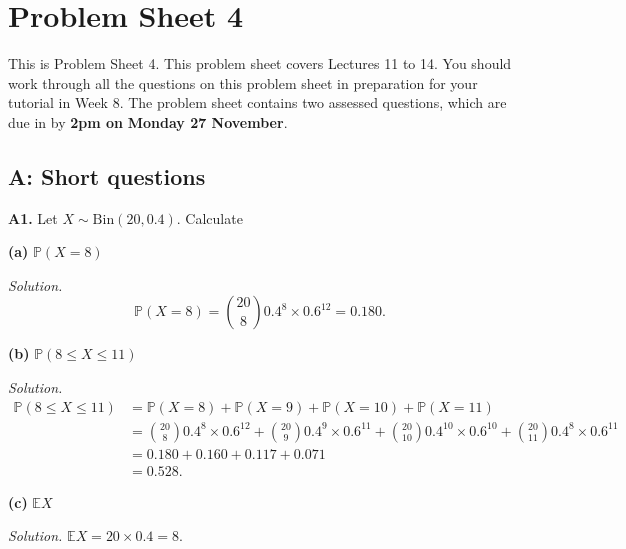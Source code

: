 \documentclass[
  a4paper,
]{book}
\newif\ifcomm\commtrue
\theoremstyle{definition}
\theoremstyle{definition}
\theoremstyle{definition}
\theoremstyle{definition}
\theoremstyle{remark}
\begin{document}
\hypertarget{P4}{%
\chapter*{Problem Sheet 4}\label{P4}}

\commfalse

This is Problem Sheet 4. This problem sheet covers Lectures 11 to 14. You should work through all the questions on this problem sheet in preparation for your tutorial in Week 8. The problem sheet contains two assessed questions, which are due in by \textbf{2pm on} \textbf{Monday 27 November}.

\hypertarget{P4-short}{%
\section*{A: Short questions}\label{P4-short}}

\textbf{A1.} Let \(X \sim \text{Bin}(20, 0.4)\). Calculate

\textbf{(a)} \(\mathbb P(X = 8)\)

\begin{myanswers}
\emph{Solution.}
\[ \mathbb P(X = 8) = \binom{20}{8} 0.4^8 \times 0.6^{12} = 0.180 . \]

\end{myanswers}

\textbf{(b)} \(\mathbb P(8 \leq X \leq 11)\)

\begin{myanswers}
\emph{Solution.}
\begin{align*}
\mathbb P(8 \leq X \leq 11) &= \mathbb P(X = 8) + \mathbb P(X = 9) + \mathbb P(X = 10) + \mathbb P(X = 11) \\ 
&= \binom{20}{8} 0.4^8 \times 0.6^{12} + \binom{20}{9} 0.4^9 \times 0.6^{11} + \binom{20}{10} 0.4^10 \times 0.6^{10} + \binom{20}{11} 0.4^8 \times 0.6^{11} \\
&= 0.180 + 0.160 + 0.117 + 0.071 \\
&= 0.528 .
\end{align*}

\end{myanswers}

\textbf{(c)} \(\mathbb EX\)

\begin{myanswers}
\emph{Solution.} \(\mathbb EX = 20 \times 0.4 = 8\).

\end{myanswers}
\end{document}
